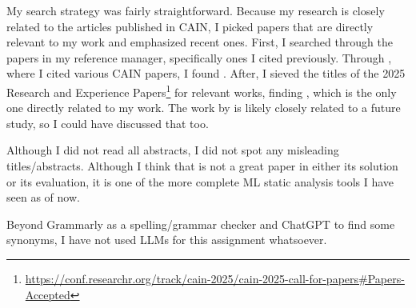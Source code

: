     My search strategy was fairly straightforward.
    Because my research is closely related to the articles published in CAIN, I picked papers that are directly relevant to my work and emphasized recent ones.
    First, I searched through the papers in my reference manager, specifically ones I cited previously.
    Through \citet{meijer_contract_2024}, where I cited various CAIN papers, I found \citet{recupito2024unmasking}.
    After, I sieved the titles of the 2025 Research and Experience Papers\footnote{\href{https://conf.researchr.org/track/cain-2025/cain-2025-call-for-papers\#Papers-Accepted}{https://conf.researchr.org/track/cain-2025/cain-2025-call-for-papers\#Papers-Accepted}} for relevant works, finding \citet{shivashankar2025mlscent}, which is the only one directly related to my work.
    The work by \citet{vonderhaar2025generating} is likely closely related to a future study, so I could have discussed that too.
    
    Although I did not read all abstracts, I did not spot any misleading titles/abstracts.
    Although I think that \citet{shivashankar2025mlscent} is not a great paper in either its solution or its evaluation, it is one of the more complete ML static analysis tools I have seen as of now.
    
    Beyond Grammarly as a spelling/grammar checker and ChatGPT to find some synonyms, I have not used LLMs for this assignment whatsoever.




    

